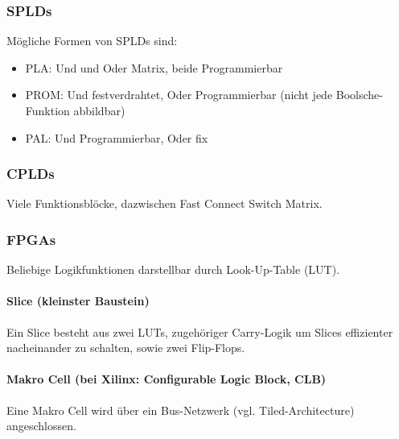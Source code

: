 \subsubsection{SPLDs}
Mögliche Formen von SPLDs sind:
\begin{itemize}
    \item PLA: Und und Oder Matrix, beide Programmierbar
    \item PROM: Und festverdrahtet, Oder Programmierbar (nicht jede Boolsche-Funktion abbildbar)
    \item PAL: Und Programmierbar, Oder fix
\end{itemize}

\subsubsection{CPLDs}
Viele Funktionsblöcke, dazwischen \glqq{}Fast Connect Switch Matrix\grqq{}.

\subsubsection{FPGAs}
Beliebige Logikfunktionen darstellbar durch Look-Up-Table (LUT).
\paragraph{Slice (kleinster Baustein)}
Ein Slice besteht aus zwei LUTs, zugehöriger Carry-Logik um Slices effizienter nacheinander zu schalten, sowie zwei Flip-Flops. 

\paragraph{Makro Cell (bei Xilinx: Configurable Logic Block, CLB)}
Eine Makro Cell wird über ein Bus-Netzwerk (vgl. Tiled-Architecture) angeschlossen.
